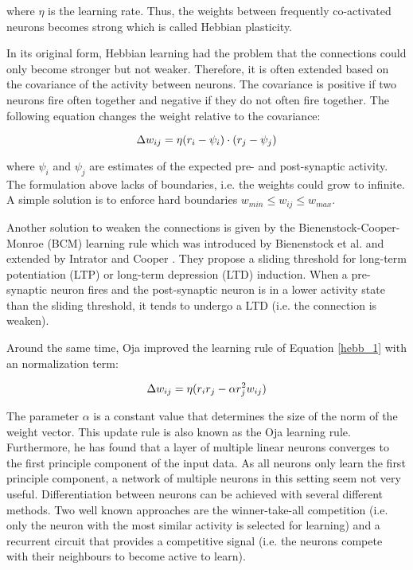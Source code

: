 where \(\eta\) is the learning rate.
Thus, the weights between frequently co-activated neurons becomes strong which is called Hebbian plasticity.

In its original form, Hebbian learning had the problem that the connections could only become stronger but not weaker.
Therefore, it is often extended based on the covariance of the activity between neurons.
The covariance is positive if two neurons fire often together and negative if they do not often fire together.
The following equation changes the weight relative to the covariance:

\begin{equation}\eqlbl{hebb_2}
	\Delta w_{ij} = \eta (r_i - \psi_i) \cdot (r_j - \psi_j)
\end{equation}

where \(\psi_i\) and \(\psi_j\) are estimates of the expected pre- and post-synaptic activity.
The formulation above lacks of boundaries, i.e. the weights could grow to infinite.
A simple solution is to enforce hard boundaries \(w_{min} \leq w_{ij} \leq w_{max}\).

Another solution to weaken the connections is given by the Bienenstock-Cooper-Monroe (BCM) learning rule which was introduced by Bienenstock et al.  and extended by Intrator and Cooper .
They propose a sliding threshold for long-term potentiation (LTP) or long-term depression (LTD) induction.
When a pre-synaptic neuron fires and the post-synaptic neuron is in a lower activity state than the sliding threshold, it tends to undergo a LTD (i.e. the connection is weaken).

Around the same time, Oja  improved the learning rule of Equation \eqref*{hebb_1} with an normalization term:

\begin{equation}\eqlbl{hebb_3}
	\Delta w_{ij} = \eta (r_i r_j - \alpha r^2_j w_{ij})
\end{equation}

The parameter \(\alpha\) is a constant value that determines the size of the norm of the weight vector.
This update rule is also known as the Oja learning rule. 
Furthermore, he has found that a layer of multiple linear neurons converges to the first principle component of the input data.
As all neurons only learn the first principle component, a network of multiple neurons in this setting seem not very useful.
Differentiation between neurons can be achieved with several different methods.
Two well known approaches are the winner-take-all competition (i.e. only the neuron with the most similar activity is selected for learning) and a recurrent circuit that provides a competitive signal (i.e. the neurons compete with their neighbours to become active to learn).

